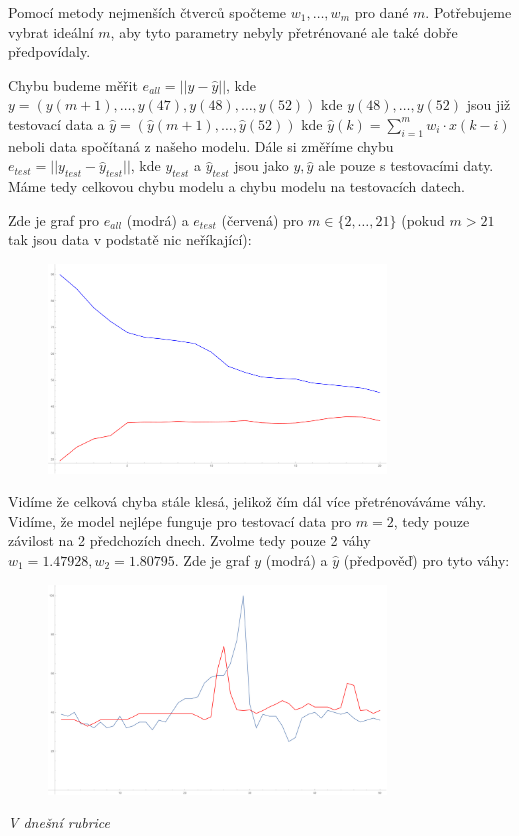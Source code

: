\documentclass[12pt, a4paper]{article}
\begin{document}
Pomocí metody nejmenších čtverců spočteme $w_1,\dots,w_m$ pro dané $m$. Potřebujeme vybrat ideální $m$, aby tyto parametry nebyly přetrénované ale také dobře předpovídaly. 

Chybu budeme měřit $e_{all} = ||y - \hat{y}||$, kde \\$y = (y(m+1), \dots, y(47), y(48),\dots,y(52))$ kde $y(48),\dots,y(52)$ jsou již testovací data a $\hat{y} = (\hat{y}(m+1),\dots,\hat{y}(52))$ kde $\hat{y}(k)=\sum^{m}_{i=1} w_i \cdot x(k-i)$ neboli data spočítaná z našeho modelu. Dále si změříme chybu $e_{test}=||y_{test}-\hat{y}_{test}||$, kde $y_{test}$ a $\hat{y}_{test}$ jsou jako $y,\hat{y}$ ale pouze s testovacími daty. Máme tedy celkovou chybu modelu a chybu modelu na testovacích datech. 

Zde je graf pro $e_{all}$ (modrá) a $e_{test}$ (červená) pro $m \in \{2,\dots,21\}$ (pokud $m>21$ tak jsou data v podstatě nic neříkající):
\begin{figure}[h]
\centering
\includegraphics[width=0.8\textwidth]{graf_2.pdf}
\end{figure}

Vidíme že celková chyba stále klesá, jelikož čím dál více přetrénováváme váhy. Vidíme, že model nejlépe funguje pro testovací data pro $m=2$, tedy pouze závilost na 2 předchozích dnech. Zvolme tedy pouze 2 váhy $w_1 = 1.47928, w_2=1.80795$. Zde je graf $y$ (modrá) a $\hat{y}$  (předpověď) pro tyto váhy:
\begin{figure}[h]
\centering
\includegraphics[width=0.8\textwidth]{graf_2_1.pdf}
\end{figure}

\textit{
V dnešní rubrice
}
\end{document}
